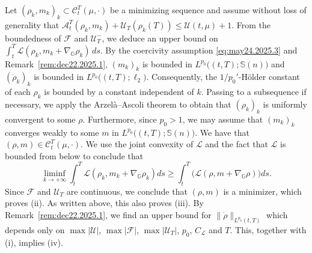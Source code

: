 \documentclass[10pt]{article}
\numberwithin{equation}{section}
\newcommand{\cA}{ \mathcal{A}}
\newcommand{\cC}{ \mathcal{C}}
\newcommand{\cF}{ \mathcal{F}}
\newcommand{\cL}{ \mathcal{L}}
\newcommand{\cU}{ \mathcal{U}}
\newcommand{\bG}{\mathbb G}
\newcommand{\bS}{\mathbb S}
\def\cL{\mathcal{L}}
\begin{document}
Let $(\rho_k, m_k)_k \subset \cC_t^T(\mu, \cdot)$ be a minimizing sequence and assume without loss of generality that $\cA_t^T(\rho_k, m_k)+\cU_T(\rho_k(T)) \leq \cU(t, \mu)+1.$ From the boundedness of $\cF$ and $\cU_T^-$, we deduce an upper bound on $\int_t^T \cL(\rho_k, m_k+\nabla_\bG\rho_k)\,ds$. By the coercivity assumption \eqref{eq:may24.2025.3} and Remark~\ref{rem:dec22.2025.1}, $(m_k)_k$ is bounded in $L^{p_0}\big((t, T);\bS(n)\big)$ and $(\dot\rho_k)_k$ is bounded in $L^{p_0}\big((t, T);\ell_2\big)$. Consequently, the $1/p_0'$-H\"older constant of each $\rho_k$ is bounded by a constant independent of $k$. Passing to a subsequence if necessary, we apply the Arzel\`a--Ascoli theorem to obtain that  $(\rho_k)_k$ is uniformly convergent to some $\rho.$ Furthermore, since $p_0>1$, we may assume that $(m_k)_k$ converges weakly to some $m$ in $L^{p_0}\big((t, T);\bS(n)\big)$. We have that $(\rho, m) \in \cC_t^T(\mu, \cdot)$. We use the joint convexity of $\cL$ and the fact that $\cL$ is bounded from below  to conclude that
\[
\liminf_{k \to+\infty} \int_t^T\cL(\rho_k, m_k+  \nabla_\bG \rho_k)ds \geq  \int_{t}^T \Big(\cL(\rho, m+  \nabla_\bG \rho)\Big)ds.
\]
Since  $\cF$ and $\cU_T$ are continuous, we conclude that $(\rho, m)$ is a minimizer, which proves (ii). As written above, this also proves (iii). By Remark~\ref{rem:dec22.2025.1}, we find an upper bound for $\|\dot \rho\|_{L^{p_0}(t, T)}$ which depends only on  $\max |\cU|$, $\max |\cF|$, $\max |\cU_T|$, $p_0$, $C_{\cL}$ and $T$. This, together with (i), implies (iv).
\endproof
%
\end{document}
